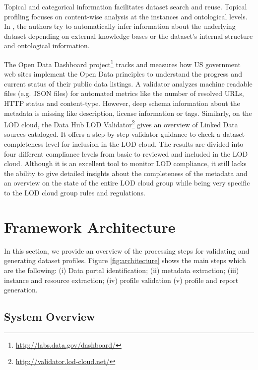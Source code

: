 \documentclass{sig-alternate}
\begin{document}
Topical and categorical information facilitates dataset search and reuse. Topical profiling focuses on content-wise analysis at the instances and ontological levels. In \cite{6690016,Bohm:2012:LTG:2396761.2398718,scalableApproach}, the authors try to automatically infer information about the underlying dataset depending on external knowledge bases or the dataset's internal structure and ontological information.

The Open Data Dashboard project\footnote{\url{http://labs.data.gov/dashboard/}} tracks and measures how US government web sites implement the Open Data principles to understand the progress and current status of their public data listings. A validator analyzes machine readable files (e.g. JSON files) for automated metrics like the number of resolved URLs, HTTP status and content-type. However, deep schema information about the metadata is missing like description, license information or tags. Similarly, on the LOD cloud, the Data Hub LOD Validator\footnote{\url{http://validator.lod-cloud.net/}} gives an overview of Linked Data sources cataloged. It offers a step-by-step validator guidance to check a dataset completeness level for inclusion in the LOD cloud. The results are divided into four different compliance levels from basic to reviewed and included in the LOD cloud. Although it is an excellent tool to monitor LOD compliance, it still lacks the ability to give detailed insights about the completeness of the metadata and an overview on the state of the entire LOD cloud group while being very specific to the LOD cloud group rules and regulations.


\section{Framework Architecture}
\label{sec:framework}
In this section, we provide an overview of the processing steps for validating and generating dataset profiles. Figure \ref{fig:architecture} shows the main steps which are the following: (i) Data portal identification; (ii) metadata extraction; (iii) instance and resource extraction; (iv) profile validation (v) profile and report generation.

\subsection{System Overview}
\end{document}
